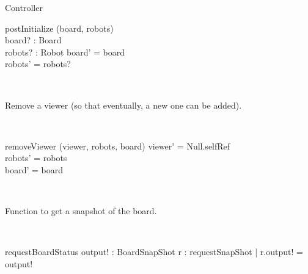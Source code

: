 \documentclass[12pt]{article}
\begin{document}
\begin{class}{Controller}
\begin{schema}{postInitialize}
\Delta (board, robots) \\
board? : Board \\
robots? : \power Robot
\where
board' = board \\
robots' = robots?
\end{schema}\\
\begin{classcom}
Remove a viewer (so that eventually, a new one can be added).
\end{classcom} \\
\begin{schema}{removeViewer}
\Delta (viewer, robots, board)
\where
viewer' = Null.selfRef \\
robots' = robots \\
board' = board
\end{schema}\\
\begin{classcom}
Function to get a snapshot of the board.
\end{classcom} \\
\begin{schema}{requestBoardStatus}
output! : BoardSnapShot
\where
\exists r : requestSnapShot | r.output! = output!
\end{schema}
\end{class}
\end{document}
